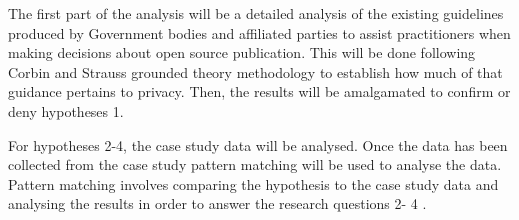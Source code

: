 The first part of the analysis will be a detailed analysis of the existing guidelines produced by Government bodies and affiliated parties to assist practitioners when making decisions about open source publication. This will be done following Corbin and Strauss grounded theory methodology \cite{Corbin_Strauss} to establish how much of that guidance pertains to privacy. Then, the results will be amalgamated to confirm or deny hypotheses 1.

For hypotheses 2-4, the case study data will be analysed. Once the data has been collected from the case study pattern matching will be used to analyse the data. Pattern matching involves comparing the hypothesis to the case study data and analysing the results in order to answer the research questions 2- 4 \cite{Yin_CSMeth2012}. 



